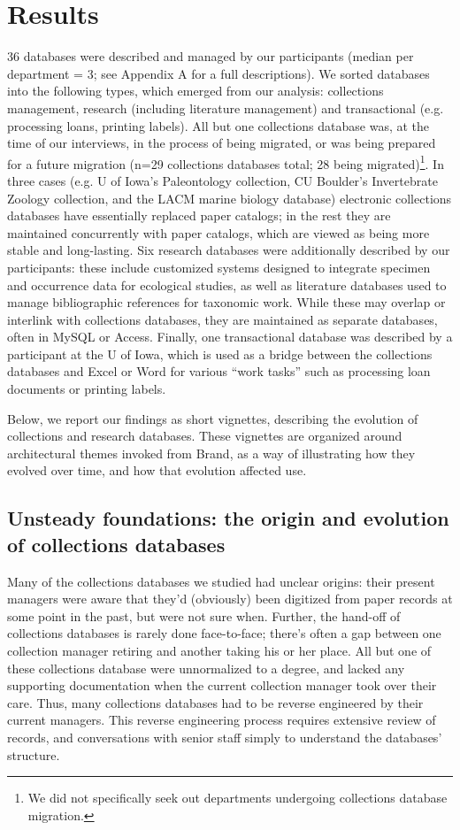 \section{Results}

36 databases were described and managed by our participants (median per department = 3; see Appendix A for a full descriptions). We sorted databases into the following types, which emerged from our analysis: collections management, research (including literature management) and transactional (e.g. processing loans, printing labels). All but one collections database was, at the time of our interviews, in the process of being migrated, or was being prepared for a future migration (n=29 collections databases total; 28 being migrated)\footnote{We did not specifically seek out departments undergoing collections database migration.}. In three cases (e.g. U of Iowa’s Paleontology collection, CU Boulder’s Invertebrate Zoology collection, and the LACM marine biology database) electronic collections databases have essentially replaced paper catalogs; in the rest they are maintained concurrently with paper catalogs, which are viewed as being more stable and long-lasting. Six research databases were additionally described by our participants: these include customized systems designed to integrate specimen and occurrence data for ecological studies, as well as literature databases used to manage bibliographic references for taxonomic work. While these may overlap or interlink with collections databases, they are maintained as separate databases, often in MySQL or Access. Finally, one transactional database was described by a participant at the U of Iowa, which is used as a bridge between the collections databases and Excel or Word for various “work tasks” such as processing loan documents or printing labels. 

Below, we report our findings as short vignettes, describing the evolution of collections and research databases. These vignettes are organized around architectural themes invoked from Brand, as a way of illustrating how they evolved over time, and how that evolution affected use.

\subsection{Unsteady foundations: the origin and evolution of collections databases}

Many of the collections databases we studied had unclear origins: their present managers were aware that they'd (obviously) been digitized from paper records at some point in the past, but were not sure when. Further, the hand-off of collections databases is rarely done face-to-face; there's often a gap between one collection manager retiring and another taking his or her place. All but one of these collections database were unnormalized to a degree, and lacked any supporting documentation when the current collection manager took over their care. Thus, many collections databases had to be reverse engineered by their current managers. This reverse engineering process requires extensive review of records, and conversations with senior staff simply to understand the databases’ structure. 

